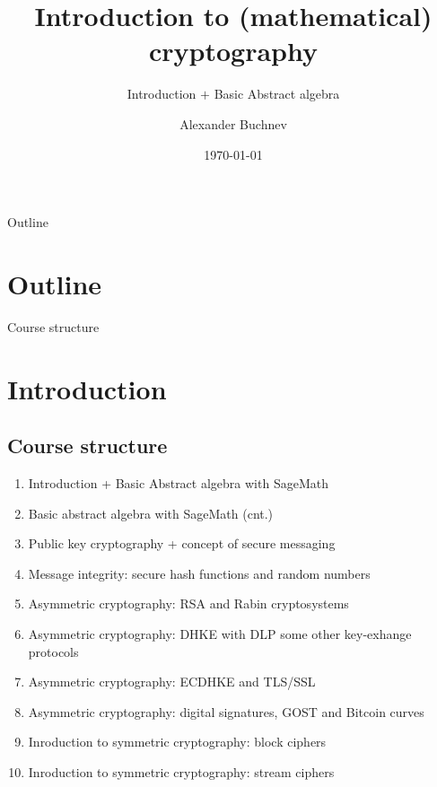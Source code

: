 \documentclass{beamer}
\title{Introduction to (mathematical) cryptography}
\subtitle{Introduction $+$ Basic Abstract algebra}
\author{Alexander Buchnev}
\date{\monthYear\today}
\begin{document}
\frame{
	\titlepage
}

\begin{frame}{Outline}
    \section{Outline}
	\tableofcontents
\end{frame}

\begin{frame}{Course structure}
    \section{Introduction}
    \subsection{Course structure}
    \begin{enumerate}
        \item Introduction + Basic Abstract algebra with SageMath
        \item Basic abstract algebra with SageMath (cnt.)
        \item Public key cryptography + concept of secure messaging %
        \item Message integrity: secure hash functions and random numbers
        \item Asymmetric cryptography: RSA and Rabin cryptosystems
        \item Asymmetric cryptography: DHKE with DLP some other key-exhange protocols 
        \item Asymmetric cryptography: ECDHKE and TLS/SSL
        \item Asymmetric cryptography: digital signatures, GOST and Bitcoin curves
        \item Inroduction to symmetric cryptography: block ciphers
        \item Inroduction to symmetric cryptography: stream ciphers
    \end{enumerate}
\end{frame}
\end{document}
